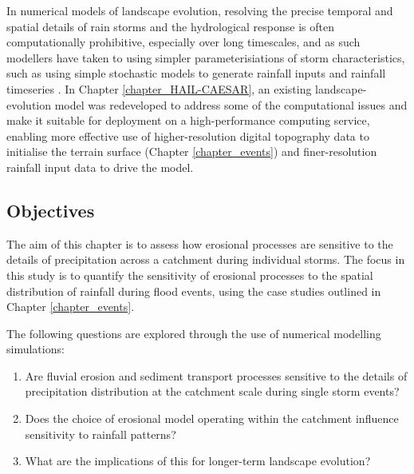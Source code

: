 In numerical models of landscape evolution, resolving the precise temporal and spatial details of rain storms and the hydrological response is often computationally prohibitive, especially over long timescales, and as such modellers have taken to using simpler parameterisiations of storm characteristics, such as using simple stochastic models to generate rainfall inputs and rainfall timeseries \citep{Eagleson1978,Tucker2001}. In Chapter \ref{chapter_HAIL-CAESAR}, an existing landscape-evolution model was redeveloped to address some of the computational issues and make it suitable for deployment on a high-performance computing service, enabling more effective use of higher-resolution digital topography data to initialise the terrain surface (Chapter \ref{chapter_events}) and finer-resolution rainfall input data to drive the model.

\subsection{Objectives}
The aim of this chapter is to assess how erosional processes are sensitive to the details of precipitation across a catchment during individual storms. The focus in this study is to quantify the sensitivity of erosional processes to the spatial distribution of rainfall during flood events, using the case studies outlined in Chapter \ref{chapter_events}.

The following questions are explored through the use of numerical modelling simulations:

\begin{enumerate}
\item Are fluvial erosion and sediment transport processes sensitive to the details of precipitation distribution at the catchment scale during single storm events?
\item Does the choice of erosional model operating within the catchment influence sensitivity to rainfall patterns? 
\item What are the implications of this for longer-term landscape evolution? 
\end{enumerate}

